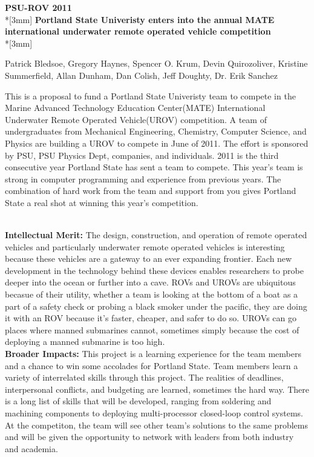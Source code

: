 \documentclass{proposalnsf}
\begin{document}
\begin{center}
{\Large{\bf PSU-ROV 2011}}\\*[3mm]
{\bf Portland State Univeristy enters into the annual MATE international underwater remote operated vehicle competition} \\*[3mm]

Patrick Bledsoe, Gregory Haynes, Spencer O. Krum, Devin Quirozoliver, Kristine Summerfield,
 Allan Dunham, Dan Colish, Jeff Doughty, Dr. Erik Sanchez

\end{center}


This is a  proposal to fund a Portland State Univeristy team to compete in the Marine Advanced Technology Education Center(MATE)
 International Underwater Remote Operated Vehicle(UROV) competition. A team of undergraduates from Mechanical Engineering,
 Chemistry, Computer Science, and Physics are building a UROV to compete in June of 2011. The effort is sponsored by PSU, 
PSU Physics Dept, companies, and individuals. 2011 is the third consecutive year Portland State has sent a team to compete.
This year's team is strong in computer programming and experience from previous years. The combination of hard work from the team and 
support from you gives Portland State a real shot at winning this year's competition.  



\ \\
\noindent
{\bf Intellectual Merit:}
The design, construction, and operation of remote operated vehicles and particularly underwater remote operated vehicles is interesting
because these vehicles are a gateway to an ever expanding frontier. Each new development in the technology behind these devices enables 
researchers to probe deeper into the ocean or further into a cave. ROVs and UROVs are ubiquitous becasue of their utility, whether a team
is looking at the bottom of a boat as a part of a safety check or probing a black smoker under the pacific, they are doing it with an ROV
because it's faster, cheaper, and safer to do so. UROVs can go places where manned submarines cannot, sometimes simply because the cost 
of deploying a manned submarine is too high.  
\ \\

\noindent
{\bf Broader Impacts:}
This project is a learning experience for the team members and a chance to win some accolades for Portland State. Team members learn 
a variety of interrelated skills through this project. The realities of deadlines, interpersonal conflicts, and budgeting are learned, 
sometimes the hard way. There is a long list of skills that will be developed, ranging from soldering and machining components to deploying 
multi-processor closed-loop control systems. At the competiton, the team will see other team's solutions to the same problems and will be
 given the opportunity to network with leaders from both industry and academia. 
\renewcommand{\thepage} {B--\arabic{page}}
\end{document}
